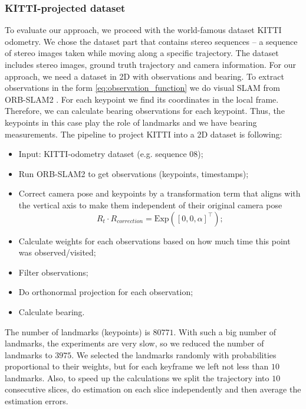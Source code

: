\subsubsection{KITTI-projected dataset}

To evaluate our approach, we proceed with the world-famous dataset KITTI odometry\cite{kitti}.
We chose the dataset part that contains stereo sequences -- a sequence of stereo images taken while moving along a
specific trajectory.
The dataset includes stereo images, ground truth trajectory and camera information.
For our approach, we need a dataset in 2D with observations and bearing.
To extract observations in the form \eqref{eq:observation_function} we do visual SLAM from ORB-SLAM2 \cite{mur2017orb}.
For each keypoint we find its coordinates in the local frame\cite{multiview}.
Therefore, we can calculate bearing observations for each keypoint.
Thus, the keypoints in this case play the role of landmarks and we have bearing measurements.
The pipeline to project KITTI into a 2D dataset is following:

\begin{itemize}
\item Input: KITTI-odometry dataset (e.g. sequence 08);
\item Run ORB-SLAM2 to get observations (keypoints, timestamps);
\item Correct camera pose and keypoints by a transformation term that aligns with the vertical axis to make them independent of their original camera pose
\begin{equation}  \label{eq:corr}
R_t \cdot R_{correction} = \mathrm{Exp}([0,0,\alpha]^{\top});
\end{equation}
\item Calculate weights for each observations based on how much time this point was observed/visited;
\item Filter observations;
\item Do orthonormal projection for each observation;
\item Calculate bearing.
\end{itemize}

The number of landmarks (keypoints) is $80771$.
With such a big number of landmarks, the experiments are very slow, so we reduced the number of landmarks to $3975$.
We selected the landmarks randomly with probabilities proportional to their weights, but for each keyframe
we left not less than $10$ landmarks.
Also, to speed up the calculations we split the trajectory
into $10$ consecutive slices, do estimation on each slice
independently and then average the estimation errors.

